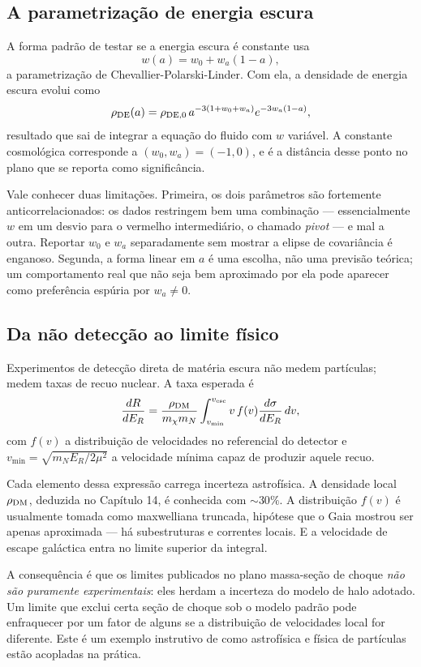 \documentclass[11pt,a4paper]{article}
\begin{document}
\subsection*{A parametrização de energia escura}

A forma padrão de testar se a energia escura é constante usa
\[
w(a)=w_0+w_a\left(1-a\right),
\]
a parametrização de Chevallier-Polarski-Linder. Com ela, a densidade de energia escura evolui como
\[
\rho_{\rm DE}(a)=\rho_{\rm DE,0}\,a^{-3(1+w_0+w_a)}e^{-3w_a(1-a)},
\]
resultado que sai de integrar a equação do fluido com $w$ variável. A constante cosmológica corresponde a $(w_0,w_a)=(-1,0)$, e é a distância desse ponto no plano que se reporta como significância.

Vale conhecer duas limitações. Primeira, os dois parâmetros são fortemente anticorrelacionados: os dados restringem bem uma combinação --- essencialmente $w$ em um desvio para o vermelho intermediário, o chamado \textit{pivot} --- e mal a outra. Reportar $w_0$ e $w_a$ separadamente sem mostrar a elipse de covariância é enganoso. Segunda, a forma linear em $a$ é uma escolha, não uma previsão teórica; um comportamento real que não seja bem aproximado por ela pode aparecer como preferência espúria por $w_a\ne0$.

\subsection*{Da não detecção ao limite físico}

Experimentos de detecção direta de matéria escura não medem partículas; medem taxas de recuo nuclear. A taxa esperada é
\[
\frac{dR}{dE_R}=\frac{\rho_{\rm DM}}{m_\chi m_N}\int_{v_{\min}}^{v_{\rm esc}}v\,f(v)\frac{d\sigma}{dE_R}\,dv,
\]
com $f(v)$ a distribuição de velocidades no referencial do detector e $v_{\min}=\sqrt{m_NE_R/2\mu^{2}}$ a velocidade mínima capaz de produzir aquele recuo.

Cada elemento dessa expressão carrega incerteza astrofísica. A densidade local $\rho_{\rm DM}$, deduzida no Capítulo 14, é conhecida com $\sim30\%$. A distribuição $f(v)$ é usualmente tomada como maxwelliana truncada, hipótese que o Gaia mostrou ser apenas aproximada --- há subestruturas e correntes locais. E a velocidade de escape galáctica entra no limite superior da integral.

A consequência é que os limites publicados no plano massa-seção de choque \emph{não são puramente experimentais}: eles herdam a incerteza do modelo de halo adotado. Um limite que exclui certa seção de choque sob o modelo padrão pode enfraquecer por um fator de alguns se a distribuição de velocidades local for diferente. Este é um exemplo instrutivo de como astrofísica e física de partículas estão acopladas na prática.
\end{document}
